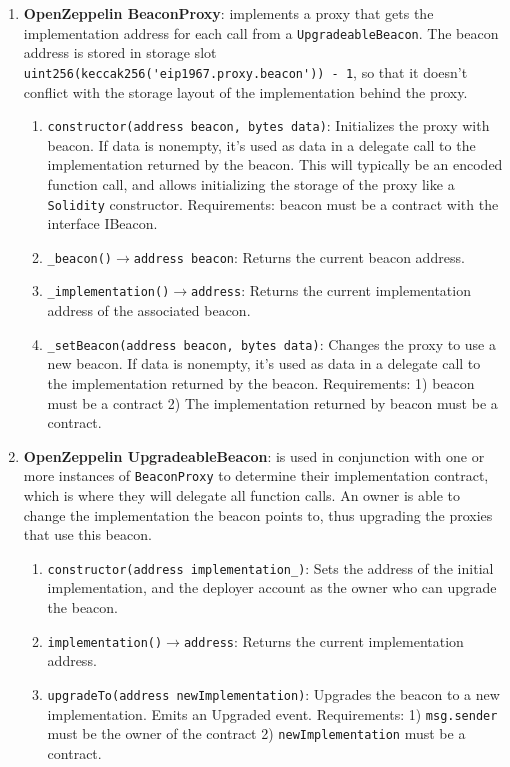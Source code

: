 \begin{enumerate}
\item\textbf{OpenZeppelin BeaconProxy}: implements a proxy that gets the implementation address for each call from a \verb|UpgradeableBeacon|. The beacon address is stored in storage slot\\\verb|uint256(keccak256('eip1967.proxy.beacon')) - 1|, so that it doesn’t conflict with the storage layout of the implementation behind the proxy.
	\begin{enumerate}
	\item\verb|constructor(address beacon, bytes data)|: Initializes the proxy with beacon. If data is nonempty, it’s used as data in a delegate call to the implementation returned by the beacon. This will typically be an encoded function call, and allows initializing the storage of the proxy like a \verb|Solidity| constructor. Requirements: beacon must be a contract with the interface IBeacon.
	\item\verb|_beacon()|$\rightarrow$\verb|address beacon|: Returns the current beacon address.
	\item\verb|_implementation()|$\rightarrow$\verb|address|: Returns the current implementation address of the associated beacon.
	\item\verb|_setBeacon(address beacon, bytes data)|: Changes the proxy to use a new beacon. If data is nonempty, it’s used as data in a delegate call to the implementation returned by the beacon. Requirements: 1) beacon must be a contract 2) The implementation returned by beacon must be a contract.
	\end{enumerate}

\item\textbf{OpenZeppelin UpgradeableBeacon}: is used in conjunction with one or more instances of \verb|BeaconProxy| to determine their implementation contract, which is where they will delegate all function calls. An owner is able to change the implementation the beacon points to, thus upgrading the proxies that use this beacon.
	\begin{enumerate}
	\item\verb|constructor(address implementation_)|: Sets the address of the initial implementation, and the deployer account as the owner who can upgrade the beacon.
	\item\verb|implementation()|$\rightarrow$\verb|address|: Returns the current implementation address.
	\item\verb|upgradeTo(address newImplementation)|: Upgrades the beacon to a new implementation. Emits an Upgraded event. Requirements: 1) \verb|msg.sender| must be the owner of the contract 2) \verb|newImplementation| must be a contract.
	\end{enumerate}


\end{enumerate}
